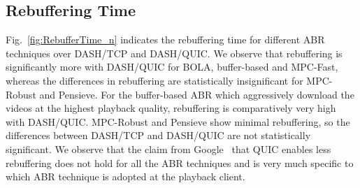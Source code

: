 
%

\subsection{Rebuffering Time}
Fig.~\ref{fig:RebufferTime_n} indicates the rebuffering time for different ABR techniques over DASH/TCP and DASH/QUIC. We observe that rebuffering is significantly more with DASH/QUIC for BOLA, buffer-based and MPC-Fast, whereas the differences in rebuffering are statistically insignificant for MPC-Robust and Pensieve. For the buffer-based ABR which aggressively download the videos at the highest playback quality, rebuffering is comparatively very high with DASH/QUIC. MPC-Robust and Pensieve show minimal rebuffering, so the differences between DASH/TCP and DASH/QUIC are not statistically significant. We observe that the claim from Google~\cite{langley2017quic} that QUIC enables less rebuffering does not hold for all the ABR techniques and is very much specific to which ABR technique is adopted at the playback client.  


